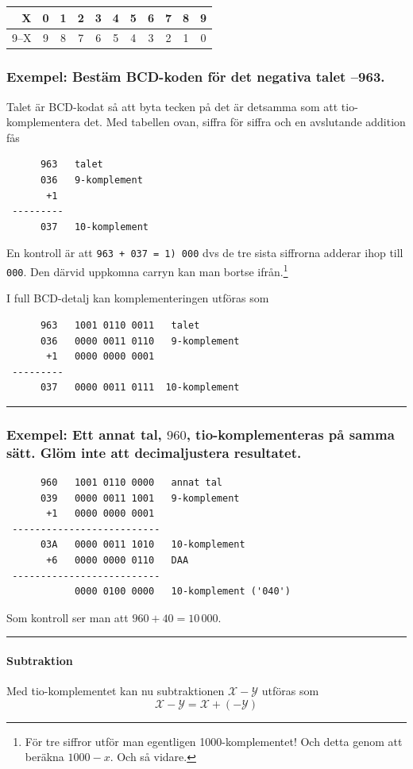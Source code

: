\documentclass[oneside,10pt,a4paper,swedish]{scrbook}
\newcommand{\startex}[1]{\subsubsection{Exempel: #1}}
\newcommand{\slutex}{\vspace{-8mm}\begin{flushright} \rule{1ex}{1ex} \end{flushright}}
\newcommand{\asm}[1]{\texttt{#1}}
\begin{document}
\begin{center}
\begin{tabular}{r|cccccccccc|}
 X    & 0 & 1 & 2 & 3 & 4 & 5 & 6 & 7 & 8 & 9 \\
 \hline
 9--X & 9 & 8 & 7 & 6 & 5 & 4 & 3 & 2 & 1 & 0 \\
 \end{tabular}
\end{center}

\startex{Bestäm BCD-koden för det negativa talet --963.}

Talet är BCD-kodat så att byta tecken på det är detsamma som att tio-komplementera det. Med tabellen ovan, siffra för siffra och en avslutande addition fås


\begin{center}
\begin{lstlisting}
      963   talet
      036   9-komplement
       +1
 ---------
      037   10-komplement
\end{lstlisting}
\end{center}
En kontroll är att \asm{963 + 037 = 1) 000} dvs de tre sista siffrorna adderar ihop till \asm{000}. Den därvid uppkomna carryn kan man bortse ifrån.\footnote{För tre siffror utför man egentligen 1000-komplementet! Och detta genom att beräkna $1000 - x$. Och så vidare.} 


I full BCD-detalj kan komplementeringen utföras som 
\begin{center}
\begin{lstlisting}
      963   1001 0110 0011   talet
      036   0000 0011 0110   9-komplement
       +1   0000 0000 0001  
 ---------
      037   0000 0011 0111  10-komplement
\end{lstlisting}
\end{center}
\slutex

\startex{Ett annat tal, $960$, tio-komplementeras på samma sätt. Glöm inte att decimal\-justera resultatet.}
\begin{center}
\begin{lstlisting}
      960   1001 0110 0000   annat tal
      039   0000 0011 1001   9-komplement
       +1   0000 0000 0001  
 --------------------------
      03A   0000 0011 1010   10-komplement
       +6   0000 0000 0110   DAA
 --------------------------
            0000 0100 0000   10-komplement ('040')
\end{lstlisting}
\end{center}
Som kontroll ser man att $960 + 40 = 10\,000$.
\slutex

\paragraph{Subtraktion}
Med tio-komplementet kan nu subtraktionen $\mathcal{X}-\mathcal{Y}$  utföras som  \[\mathcal{X}-\mathcal{Y}=\mathcal{X}+(-\mathcal{Y})\]
\end{document}
